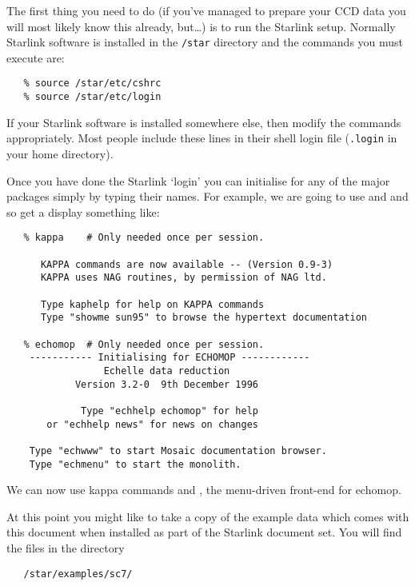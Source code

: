 The first thing you need to do (if you've managed to prepare your CCD
data you will most likely know this already, but\ldots ) is to run the
Starlink setup.
Normally Starlink software is installed in the \verb+/star+ directory
and the commands you must execute are:

{
\scspec{\small}{ }
\begin{verbatim}
   % source /star/etc/cshrc
   % source /star/etc/login
\end{verbatim}
}

If your Starlink software is installed somewhere else,
then modify the commands appropriately.
Most people include these lines in their shell login file
(\verb+.login+ in your home directory).

Once you have done the Starlink `login' you can initialise for any of the
major packages simply by typing their names.
For example, we are going to use
\cite{kappa} and
\cite{echomop} and so get a display
something like:

{
\scspec{\small}{ }
\begin{verbatim}
   % kappa    # Only needed once per session.

      KAPPA commands are now available -- (Version 0.9-3)
      KAPPA uses NAG routines, by permission of NAG ltd.

      Type kaphelp for help on KAPPA commands
      Type "showme sun95" to browse the hypertext documentation

   % echomop  # Only needed once per session.
    ----------- Initialising for ECHOMOP ------------
                 Echelle data reduction
            Version 3.2-0  9th December 1996

             Type "echhelp echomop" for help
       or "echhelp news" for news on changes

    Type "echwww" to start Mosaic documentation browser.
    Type "echmenu" to start the monolith.
\end{verbatim}
}

We can now use {\sc kappa} commands and
,
the menu-driven front-end for {\sc echomop}.

At this point you might like to take a copy of the example data which comes
with this document when installed as part of the Starlink document set.
You will find the files in the directory

{
\scspec{\small}{ }
\begin{verbatim}
   /star/examples/sc7/
\end{verbatim}
}

